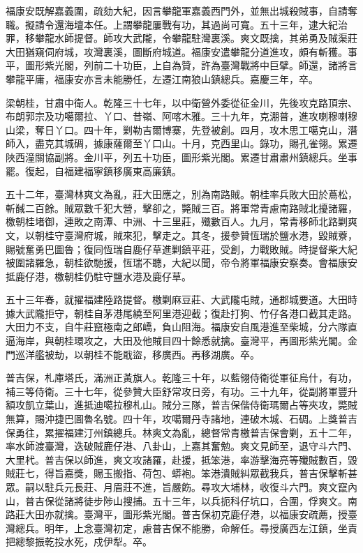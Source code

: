 \begin{pinyinscope}
福康安既解嘉義圍，疏劾大紀，因言攀龍軍嘉義西門外，並無出城殺賊事，自請奪職。擬請令還海壇本任。上謂攀龍屢戰有功，其過尚可寬。五十三年，逮大紀治罪，移攀龍水師提督。師攻大武隴，令攀龍駐灣裏溪。爽文既擒，其弟勇及賊渠莊大田猶窺伺府城，攻灣裏溪，圖斷府城道。福康安遣攀龍分道進攻，頗有斬獲。事平，圖形紫光閣，列前二十功臣，上自為贊，許為臺灣戰將中巨擘。師還，諸將言攀龍平庸，福康安亦言未能勝任，左遷江南狼山鎮總兵。嘉慶三年，卒。

梁朝桂，甘肅中衛人。乾隆三十七年，以中衛營外委從征金川，先後攻克路頂宗、布朗郭宗及功噶爾拉、丫口、昔嶺、阿喀木雅。三十九年，克淜普，進攻喇穆喇穆山梁，奪日丫口。四十年，剿勒吉爾博寨，先登被創。四月，攻木思工噶克山，潛師入，盡克其城碉，據康薩爾至丫口山。十月，克西里山。錄功，賜孔雀翎。累遷陜西潼關協副將。金川平，列五十功臣，圖形紫光閣。累遷甘肅肅州鎮總兵。坐事罷。復起，自福建福寧鎮移廣東高廉鎮。

五十二年，臺灣林爽文為亂，莊大田應之，別為南路賊。朝桂率兵敗大田於蔦松，斬馘二百餘。賊眾數千犯大營，擊卻之，斃賊三百。將軍常青慮南路賊北擾諸羅，檄朝桂堵御，連敗之南潭、中洲、十三里莊，殲數百人。九月，常青移師北路剿爽文，以朝桂守臺灣府城，賊來犯，擊走之。其冬，援參贊恆瑞於鹽水港，毀賊藔，賜號奮勇巴圖魯；復同恆瑞自鹿仔草進剿鎮平莊，受創，力戰敗賊。時提督柴大紀被圍諸羅急，朝桂欲馳援，恆瑞不聽，大紀以聞，帝令將軍福康安察奏。會福康安抵鹿仔港，檄朝桂仍駐守鹽水港及鹿仔草。

五十三年春，就擢福建陸路提督。檄剿麻豆莊、大武隴屯賊，通郡城要道。大田時據大武隴拒守，朝桂自茅港尾繞至阿里港迎截；復赴打狗、竹仔各港口截其走路。大田力不支，自牛莊竄極南之郎嶠，負山阻海。福康安自風港進至柴城，分六隊直逼海岸，與朝桂環攻之，大田及他賊目四十餘悉就擒。臺灣平，再圖形紫光閣。金門巡洋艦被劫，以朝桂不能戢盜，移廣西。再移湖廣。卒。

普吉保，札庫塔氏，滿洲正黃旗人。乾隆三十年，以藍翎侍衛從軍征烏什，有功，補三等侍衛。三十七年，從參贊大臣舒常攻日旁，有功。三十九年，從副將軍豐升額攻凱立葉山，進抵迪噶拉穆札山。賊分三隊，普吉保偕侍衛瑪爾占等夾攻，斃賊無算，賜沖捷巴圖魯名號。四十年，攻噶爾丹寺諸地，連破木城、石碉。上獎普吉保勇往，累擢福建汀州鎮總兵。林爽文為亂，總督常青檄普吉保會剿，五十二年，率水師渡臺灣，迭破賊鹿仔港、八卦山，上嘉其奮勉。爽文見師至，退守斗六門、大里杙。普吉保以師進，爽文攻諸羅，赴援，抵笨港，率游擊海亮等殲賊數百，毀賊莊七，得旨嘉獎，賜玉搬指、荷包、蟒袍。笨港潰賊糾眾截我兵，普吉保擊斬甚眾。嗣以駐兵元長莊、月眉莊不進，旨嚴飭。尋攻大埔林，收復斗六門。爽文竄內山，普吉保從諸將徒步陟山搜捕。五十三年，以兵扼科仔坑口，合圍，俘爽文。南路莊大田亦就擒。臺灣平，圖形紫光閣。普吉保初克鹿仔港，以福康安疏薦，授臺灣總兵。明年，上念臺灣初定，慮普吉保不能勝，命解任。尋授廣西左江鎮，坐責把總黎振乾投水死，戍伊犁。卒。


\end{pinyinscope}
